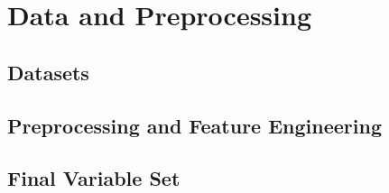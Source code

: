 \documentclass[11pt]{article}
\begin{document}
\section{Data and Preprocessing}

\subsection{Datasets}

\subsection{Preprocessing and Feature Engineering}

\subsection{Final Variable Set}


\end{document}
